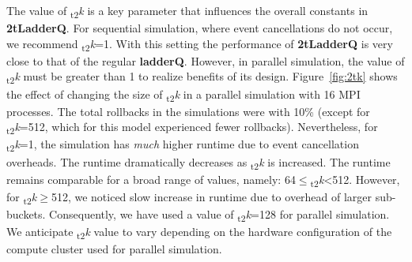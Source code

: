 The value of \textsubscript{t2}\textit{k} is a key parameter that influences the overall constants in \textbf{2tLadderQ}. For sequential simulation, where event cancellations do not occur, we recommend \textsubscript{t2}\textit{k}=1. With this setting the performance of \textbf{2tLadderQ} is very close to that of the regular \textbf{ladderQ}. However, in parallel simulation, the value of \textsubscript{t2}\textit{k} must be greater than 1 to realize benefits of its design. Figure~\ref{fig:2tk} shows the effect of changing the size of \textsubscript{t2}\textit{k} in a parallel simulation with 16 MPI processes. The total rollbacks in the simulations were with 10\% (except for \textsubscript{t2}\textit{k}=512, which for this model experienced fewer rollbacks). Nevertheless, for \textsubscript{t2}\textit{k}=1, the simulation has \emph{much} higher runtime due to event cancellation overheads.  The runtime dramatically decreases as \textsubscript{t2}\textit{k} is increased. The runtime remains comparable for a broad range of values, namely: 64$\le$\textsubscript{t2}\textit{k}\textless512. However, for \textsubscript{t2}\textit{k}$\ge$512, we noticed slow increase in runtime due to overhead of larger sub-buckets. Consequently, we have used a value of \textsubscript{t2}\textit{k}=128 for parallel simulation. We anticipate \textsubscript{t2}\textit{k} value to vary depending on the hardware configuration of the compute cluster used for parallel simulation. 


